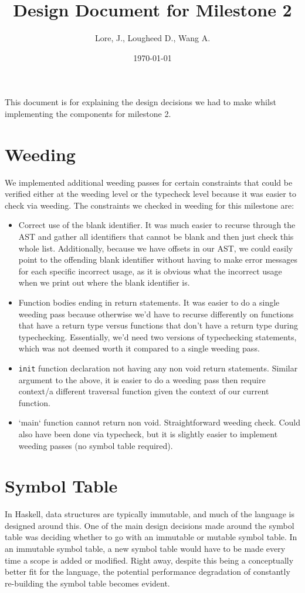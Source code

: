 \documentclass[11pt]{article}
\author{Lore, J., Lougheed D., Wang A.}
\date{\today}
\title{Design Document for Milestone 2}
\begin{document}
\maketitle
\tableofcontents

This document is for explaining the design decisions we had to make
whilst implementing the components for milestone 2.  \newpage
\section{Weeding}
\label{sec:org44c5fe7}
We implemented additional weeding passes for certain constraints
that could be verified either at the weeding level or the typecheck
level because it was easier to check via weeding. The constraints we
checked in weeding for this milestone are:
\begin{itemize}
\item Correct use of the blank identifier. It was much easier to recurse
through the AST and gather all identifiers that cannot be blank
and then just check this whole list. Additionally, because we have
offsets in our AST, we could easily point to the offending blank
identifier without having to make error messages for each specific
incorrect usage, as it is obvious what the incorrect usage when we
print out where the blank identifier is.
\item Function bodies ending in return statements. It was easier to do
a single weeding pass because otherwise we'd have to recurse
differently on functions that have a return type versus functions
that don't have a return type during typechecking. Essentially,
we'd need two versions of typechecking statements, which was not
deemed worth it compared to a single weeding pass.
\item \texttt{init} function declaration not having any non void return
statements. Similar argument to the above, it is easier to do a
weeding pass then require context/a different traversal function
given the context of our current function.
\item `main` function cannot return non void. Straightforward weeding
check. Could also have been done via typecheck, but it is slightly
easier to implement weeding passes (no symbol table required).
\end{itemize}
\section{Symbol Table}
\label{sec:org155f242}
In Haskell, data structures are typically immutable, and much of the
language is designed around this. One of the main design decisions
made around the symbol table was deciding whether to go with an
immutable or mutable symbol table. In an immutable symbol table, a
new symbol table would have to be made every time a scope is added
or modified. Right away, despite this being a conceptually better
fit for the language, the potential performance degradation of
constantly re-building the symbol table becomes evident.
\end{document}
